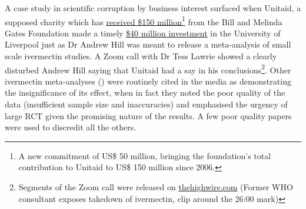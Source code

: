 \documentclass[11pt,a4paper,notitlepage]{report}
\begin{document}
A case study in scientific corruption by business interest surfaced when Unitaid, a supposed charity which has \href{https://unitaid.org/news-blog/unitaid-hails-new-us-50-million-contribution-bill-melinda-gates-foundation}{received \$150 million}\footnote{A new commitment of US\$ 50 million, bringing the foundation’s total contribution to Unitaid to US\$ 150 million since 2006.} from the Bill and Melinda Gates Foundation \cite{unitaid122017} made a timely \href{https://unitaid.org/news-blog/unitaid-funding-sees-launch-of-worlds-first-long-acting-medicines-centre-at-university-of-liverpool}{\$40 million investment} in the University of Liverpool \cite{unitaid012021} just as Dr Andrew Hill was meant to release a meta-analysis of small scale ivermectin studies. A Zoom call with Dr Tess Lawrie showed a clearly disturbed Andrew Hill saying that Unitaid had a say in his conclusions\footnote{Segments of the Zoom call were released on \href{https://thehighwire.com/videos/former-w-h-o-consultant-exposes-takedown-of-ivermectin/}{thehighwire.com} (Former WHO consultant exposes takedown of ivermectin, clip around the 26:00 mark)}. Other ivermectin meta-analyses (\cite{Popp21}) were routinely cited in the media as demonstrating the insignificance of its effect, when in fact they noted the poor quality of the data (insufficient sample size and inaccuracies) and emphasised the urgency of large RCT given the promising nature of the results. A few poor quality papers were used to discredit all the others. 
\end{document}
